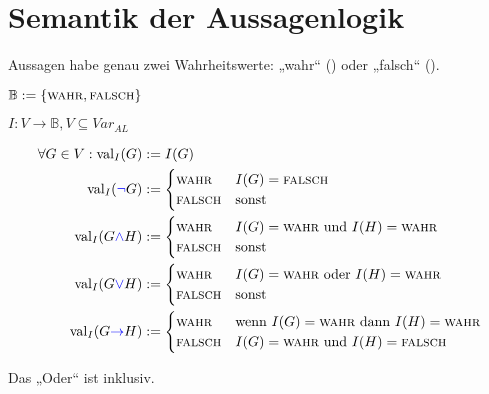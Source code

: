 \section{Semantik der Aussagenlogik}
Aussagen habe genau zwei Wahrheitswerte: „wahr“ (\consttrue) oder „falsch“ (\constfalse).
\begin{definition}
  $\mathbb{B} := \left\{ \textsc{wahr}, \textsc{falsch} \right\}$
\end{definition}
\begin{definition}[Interpretation]
  $I: V \to \mathbb{B}, V \subseteq \textit{Var}_{AL}$
\end{definition}
\begin{definition}
  \begin{align*}
    \forall G \in V: \operatorname{val}_I(G) &:= I(G) \\
    \operatorname{val}_I(\mathtt{\color{blue}\neg} G) &:=
                                             \begin{cases}
                                               \textsc{wahr} & I(G) = \textsc{falsch} \\
                                               \textsc{falsch} & \text{sonst}
                                             \end{cases} \\
    \operatorname{val}_I(G \mathtt{\color{blue}\wedge} H) &:=
                                               \begin{cases}
                                                 \textsc{wahr} & I(G) = \textsc{wahr} \text{ und } I(H) = \textsc{wahr} \\
                                                 \textsc{falsch} & \text{sonst}
                                               \end{cases} \\
    \operatorname{val}_I(G \mathtt{\color{blue}\vee} H) &:=
                                               \begin{cases}
                                                 \textsc{wahr} & I(G) = \textsc{wahr} \text{ oder } I(H) = \textsc{wahr} \\
                                                 \textsc{falsch} & \text{sonst}
                                               \end{cases} \\
    \operatorname{val}_I(G \mathtt{\color{blue}\to} H) &:=
                                               \begin{cases}
                                                 \textsc{wahr} & \text{wenn } I(G) = \textsc{wahr} \text{ dann } I(H) = \textsc{wahr} \\
                                                 \textsc{falsch} & I(G) = \textsc{wahr} \text{ und } I(H) = \textsc{falsch}
                                               \end{cases}
  \end{align*}
\end{definition}
\begin{remark}
  Das „Oder“ ist inklusiv.
\end{remark}

